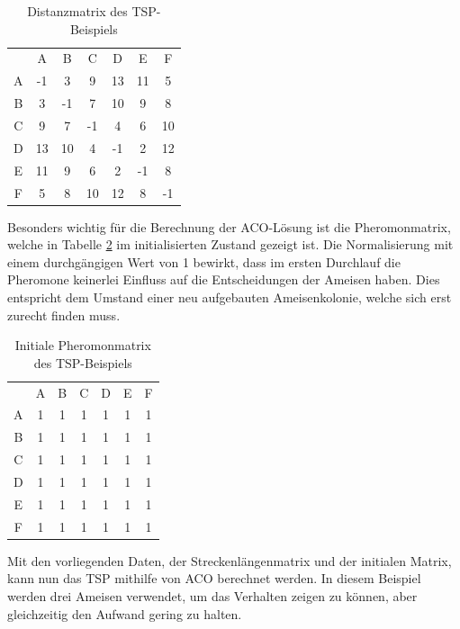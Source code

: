 	\begin{table}
		\centering
		\footnotesize
		\begin{tabular}{c c c c c c c}
			  & A & B & C & D & E & F \\
			A & -1 & 3 & 9 & 13 & 11 & 5\\ 
			B & 3 & -1 & 7 & 10 & 9 & 8\\ 
			C & 9 & 7 & -1 & 4 & 6 & 10\\
			D & 13 & 10 & 4 & -1 & 2 & 12\\
			E & 11 & 9 & 6 & 2 & -1 & 8\\
			F & 5 & 8 & 10 & 12 & 8 & -1\\
		\end{tabular}
		\caption{Distanzmatrix des TSP-Beispiels}
		\label{tspAcoNumerisch_matrix}
	\end{table}

	Besonders wichtig für die Berechnung der ACO-Lösung ist die Pheromonmatrix, welche in Tabelle \ref{tspAcoNumerisch_pheromon_initial} im initialisierten Zustand gezeigt ist. Die Normalisierung mit einem durchgängigen Wert von 1 bewirkt, dass im ersten Durchlauf die Pheromone keinerlei Einfluss auf die Entscheidungen der Ameisen haben. Dies entspricht dem Umstand einer neu aufgebauten Ameisenkolonie, welche sich erst zurecht finden muss.
	
	\begin{table}
		\centering
		\footnotesize
		\begin{tabular}{c c c c c c c}
			& A & B & C & D & E & F \\
			A & 1 & 1 & 1 & 1 & 1 & 1\\ 
			B & 1 & 1 & 1 & 1 & 1 & 1\\ 
			C & 1 & 1 & 1 & 1 & 1 & 1\\
			D & 1 & 1 & 1 & 1 & 1 & 1\\
			E & 1 & 1 & 1 & 1 & 1 & 1\\
			F & 1 & 1 & 1 & 1 & 1 & 1\\
		\end{tabular}
		\caption{Initiale Pheromonmatrix des TSP-Beispiels}
		\label{tspAcoNumerisch_pheromon_initial}
	\end{table}

	Mit den vorliegenden Daten, der Streckenlängenmatrix und der initialen Matrix, kann nun das TSP mithilfe von ACO berechnet werden. In diesem Beispiel werden drei Ameisen verwendet, um das Verhalten zeigen zu können, aber gleichzeitig den Aufwand gering zu halten.
	
